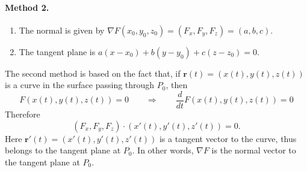 \paragraph{Method 2.} 
\begin{enumerate}
    \item The normal is given by $\nabla F(x_0,y_0,z_0) = (F_x,F_y,F_z) = (a,b,c)$.
    \item The tangent plane is $a(x-x_0)+b(y-y_0)+c(z-z_0) = 0$.
\end{enumerate}
The second method is based on the fact that, if $\textbf{r}(t)=(x(t),y(t),z(t))$ is a curve in the surface passing through $P_0$, then 
\begin{equation*}
    F(x(t),y(t),z(t)) = 0 \qquad \Longrightarrow\qquad \frac{d}{dt}F(x(t),y(t),z(t)) = 0
\end{equation*}
Therefore 
\begin{equation*}
    (F_x,F_y,F_z)\cdot (x'(t),y'(t),z'(t)) = 0.  
\end{equation*}
Here $\textbf{r}'(t) = (x'(t),y'(t),z'(t))$ is a tangent vector to the curve, thus belongs to the tangent plane at $P_0$. In other words, $\nabla F$ is the normal vector to the tangent plane at $P_0$.

